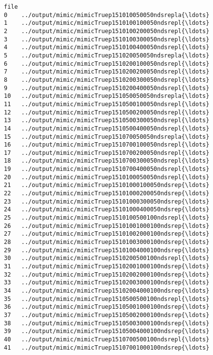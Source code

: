 \documentclass[11pt]{article}
\begin{document}
\begin{Verbatim}[commandchars=\\\{\}]
                                                  file  
0    ../output/mimic/mimicTruep151010050050ndsrepla{\ldots}  
1    ../output/mimic/mimicTruep1510100100050ndsrepl{\ldots}  
2    ../output/mimic/mimicTruep1510100200050ndsrepl{\ldots}  
3    ../output/mimic/mimicTruep1510100300050ndsrepl{\ldots}  
4    ../output/mimic/mimicTruep1510100400050ndsrepl{\ldots}  
5    ../output/mimic/mimicTruep151020050050ndsrepla{\ldots}  
6    ../output/mimic/mimicTruep1510200100050ndsrepl{\ldots}  
7    ../output/mimic/mimicTruep1510200200050ndsrepl{\ldots}  
8    ../output/mimic/mimicTruep1510200300050ndsrepl{\ldots}  
9    ../output/mimic/mimicTruep1510200400050ndsrepl{\ldots}  
10   ../output/mimic/mimicTruep151050050050ndsrepla{\ldots}  
11   ../output/mimic/mimicTruep1510500100050ndsrepl{\ldots}  
12   ../output/mimic/mimicTruep1510500200050ndsrepl{\ldots}  
13   ../output/mimic/mimicTruep1510500300050ndsrepl{\ldots}  
14   ../output/mimic/mimicTruep1510500400050ndsrepl{\ldots}  
15   ../output/mimic/mimicTruep151070050050ndsrepla{\ldots}  
16   ../output/mimic/mimicTruep1510700100050ndsrepl{\ldots}  
17   ../output/mimic/mimicTruep1510700200050ndsrepl{\ldots}  
18   ../output/mimic/mimicTruep1510700300050ndsrepl{\ldots}  
19   ../output/mimic/mimicTruep1510700400050ndsrepl{\ldots}  
20   ../output/mimic/mimicTruep1510100050050ndsrepl{\ldots}  
21   ../output/mimic/mimicTruep15101000100050ndsrep{\ldots}  
22   ../output/mimic/mimicTruep15101000200050ndsrep{\ldots}  
23   ../output/mimic/mimicTruep15101000300050ndsrep{\ldots}  
24   ../output/mimic/mimicTruep15101000400050ndsrep{\ldots}  
25   ../output/mimic/mimicTruep1510100500100ndsrepl{\ldots}  
26   ../output/mimic/mimicTruep15101001000100ndsrep{\ldots}  
27   ../output/mimic/mimicTruep15101002000100ndsrep{\ldots}  
28   ../output/mimic/mimicTruep15101003000100ndsrep{\ldots}  
29   ../output/mimic/mimicTruep15101004000100ndsrep{\ldots}  
30   ../output/mimic/mimicTruep1510200500100ndsrepl{\ldots}  
31   ../output/mimic/mimicTruep15102001000100ndsrep{\ldots}  
32   ../output/mimic/mimicTruep15102002000100ndsrep{\ldots}  
33   ../output/mimic/mimicTruep15102003000100ndsrep{\ldots}  
34   ../output/mimic/mimicTruep15102004000100ndsrep{\ldots}  
35   ../output/mimic/mimicTruep1510500500100ndsrepl{\ldots}  
36   ../output/mimic/mimicTruep15105001000100ndsrep{\ldots}  
37   ../output/mimic/mimicTruep15105002000100ndsrep{\ldots}  
38   ../output/mimic/mimicTruep15105003000100ndsrep{\ldots}  
39   ../output/mimic/mimicTruep15105004000100ndsrep{\ldots}  
40   ../output/mimic/mimicTruep1510700500100ndsrepl{\ldots}  
41   ../output/mimic/mimicTruep15107001000100ndsrep{\ldots}  

\end{Verbatim}
\end{document}
